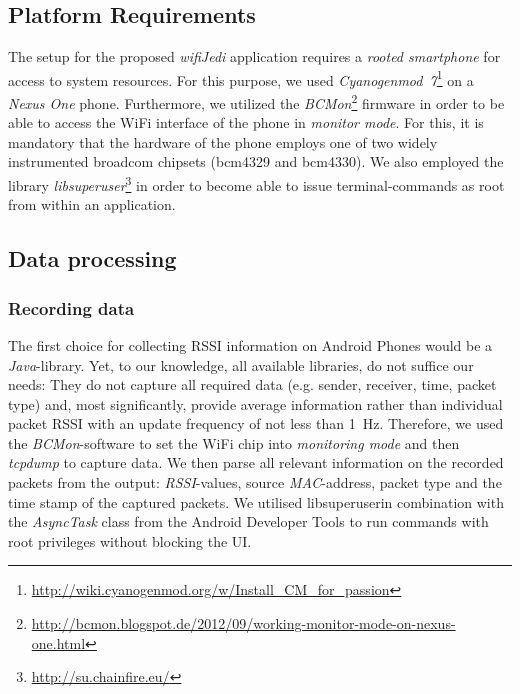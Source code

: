 \documentclass[conference]{IEEEtran}
\begin{document}
%
\subsection{Platform Requirements}
The setup for the proposed \emph{wifiJedi} application requires a \emph{rooted smartphone} for access to system resources.
For this purpose, we used \emph{Cyanogenmod~7}\footnote{\url{http://wiki.cyanogenmod.org/w/Install_CM_for_passion}} on a \emph{Nexus One} phone.
Furthermore, we utilized the \emph{BCMon}\footnote{\url{http://bcmon.blogspot.de/2012/09/working-monitor-mode-on-nexus-one.html}} firmware in order to be able to access the WiFi interface of the phone in \emph{monitor mode}.
For this, it is mandatory that the hardware of the phone employs one of two widely instrumented broadcom chipsets (bcm4329 and bcm4330).
We also employed the library \emph{libsuperuser}\footnote{\url{http://su.chainfire.eu/}} in order to become able to issue terminal-commands as root from within an application.
%
\subsection{Data processing}
\subsubsection{Recording data}
%
The first choice for collecting RSSI information on Android Phones would be a \emph{Java}-library.
Yet, to our knowledge, all available libraries, do not suffice our needs: They do not capture all required data (e.g. sender, receiver, time, packet type) and, most significantly, provide average information rather than individual packet RSSI with an update frequency of not less than 1~Hz.
Therefore, we used the \emph{BCMon}-software to set the WiFi chip into \emph{monitoring mode} and then \emph{tcpdump} to capture data.
%
%
We then parse all relevant information on the recorded packets from the output: %
\emph{RSSI}-values, source \emph{MAC}-address, packet type and the time stamp of the captured packets.
We utilised libsuperuser\footnotemark[5] in combination with the \emph{AsyncTask} class from the Android Developer Tools to run commands with root privileges without blocking the UI.
%
\end{document}
